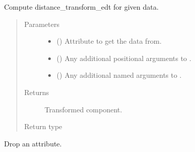 \documentclass[letterpaper,10pt,english]{sphinxmanual}
\begin{document}
\begin{fulllineitems}
\begin{fulllineitems}
\label{\detokenize{api/states:geology.src.States.distance_transform_edt}}
Compute distance\_transform\_edt for given data.
\begin{quote}\begin{description}
\item[{Parameters}] \leavevmode\begin{itemize}
\item {} 
 (\sphinxstyleliteralemphasis{\sphinxupquote{, }}) \textendash{} Attribute to get the data from.

\item {} 
 () \textendash{} Any additional positional arguments to .

\item {} 
 () \textendash{} Any additional named arguments to .

\end{itemize}

\item[{Returns}] \leavevmode
{} \textendash{} Transformed component.

\item[{Return type}] \leavevmode
{\hyperref[\detokenize{api/base_classes:geology.src.base_spatial.SpatialComponent}]{}}

\end{description}\end{quote}

\end{fulllineitems}


\begin{fulllineitems}
\label{\detokenize{api/states:geology.src.States.drop}}
Drop an attribute.


\end{fulllineitems}
\end{fulllineitems}
\end{document}
